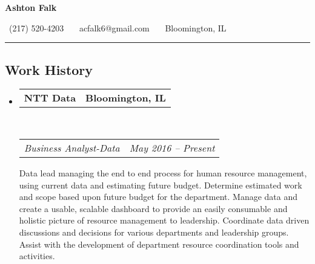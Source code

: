 \documentclass[10pt,letterpaper]{article}
\makeatletter
\newcommand{\headerrow}[2]
{\begin{tabular*}{\linewidth}{l@{\extracolsep{\fill}}r}
	#1 &
	#2 \\
\end{tabular*}}
\makeatother
\begin{document}
\begin{center}
{\LARGE \textbf{Ashton Falk}}

\ (217) 520-4203 \ \textbullet \ \ acfalk6@gmail.com \ \textbullet \ \ Bloomington, IL
\end{center}

\hrule
\vspace{-0.4em}
\subsection*{Work History}

\begin{itemize}
	\parskip=0.1em

	\item
	\headerrow
		{\textbf{NTT Data}}
		{\textbf{Bloomington, IL}}
	\\
	\headerrow
		{\emph{Business Analyst-Data}}
		{\emph{May 2016 -- Present}}
                Data lead managing the end to end process for human resource management, using current data and estimating future budget.  Determine estimated work and scope based upon future budget for the department.  Manage data and create a usable, scalable dashboard to provide an easily consumable and holistic picture of resource management to leadership.  Coordinate data driven discussions and decisions for various departments and leadership groups.  Assist with the development of department resource coordination tools and activities.


\end{itemize}
\end{document}

